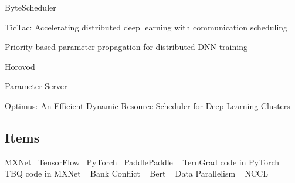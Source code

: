 ByteScheduler ~\cite{peng2019bytescheduler}

TicTac: Accelerating distributed deep learning with communication scheduling ~\cite{hashemi2018tictac}

Priority-based parameter propagation for distributed DNN training ~\cite{jayarajan2019priority}

Horovod ~\cite{horovod}

Parameter Server ~\cite{li2013parameter}

Optimus: An Efficient Dynamic Resource Scheduler for Deep Learning Clusters ~\cite{Peng2018Optimus}

\subsection{Items}

MXNet~\cite{chen2015mxnet, MXNetWebsite}
TensorFlow~\cite{Tensorflow}
PyTorch~\cite{Pytorch}
PaddlePaddle ~\cite{paddlepaddlecode}
TernGrad code in PyTorch ~\cite{open-source-Terngrad}
TBQ code in MXNet ~\cite{open-source-TBQ}
Bank Conflict ~\cite{bank-conflicts-in-GPU}
Bert ~\cite{devlin2018bert}
Data Parallelism ~\cite{dean2012large}
NCCL ~\cite{NCCL}



\label{sect:introv1}